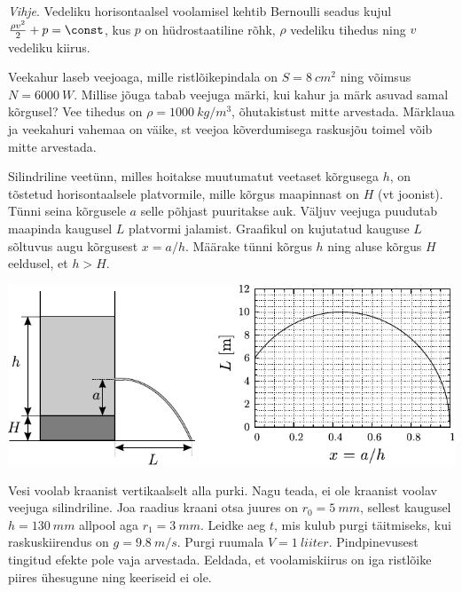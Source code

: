 \documentclass[10pt]{article}
\begin{document}
{\emph{Vihje}. 
Vedeliku horisontaalsel voolamisel kehtib Bernoulli seadus kujul $\frac{\rho v^2}{2}+p=\const$, kus $p$ on hüdrostaatiline rõhk, $\rho$ vedeliku tihedus ning $v$ vedeliku kiirus.
\probend
\bigskip


Veekahur laseb veejoaga, mille ristlõikepindala on $S = \SI{8}{cm^2}$ ning võimsus $N = \SI{6000}{W}$. Millise jõuga tabab veejuga märki, kui kahur ja märk asuvad samal kõrgusel? Vee tihedus on $\rho = \SI{1000}{kg/m^3}$, õhutakistust mitte arvestada. Märklaua ja veekahuri vahemaa on väike, st veejoa kõverdumisega raskusjõu toimel võib mitte arvestada.
\probend
\bigskip


Silindriline veetünn, milles hoitakse muutumatut veetaset kõrgusega $h$, on tõstetud horisontaalsele platvormile, mille kõrgus maapinnast on $H$ (vt joonist). Tünni seina kõrgusele $a$ selle põhjast puuritakse auk. Väljuv veejuga puudutab maapinda kaugusel $L$ platvormi jalamist. Graafikul on kujutatud kauguse $L$ sõltuvus augu kõrgusest $x = a/h$. Määrake tünni kõrgus $h$ ning aluse kõrgus $H$ eeldusel, et $h > H$.

\begin{center}
	\includegraphics[width=\linewidth]{2005-v3g-05-yl}
\end{center}
\probend
\bigskip


Vesi voolab kraanist vertikaalselt alla purki. Nagu teada, ei ole kraanist voolav veejuga silindriline. Joa raadius kraani otsa juures on $r_0 = \SI{5}{mm}$, sellest kaugusel $h = \SI{130}{mm}$ allpool aga $r_1 = \SI{3}{mm}$. Leidke aeg $t$, mis kulub purgi täitmiseks, kui raskuskiirendus on $g = \SI{9,8}{m/s}$. Purgi ruumala $V = \SI{1}{liiter}$. Pindpinevusest tingitud efekte pole vaja arvestada. Eeldada, et voolamiskiirus on iga ristlõike piires ühesugune ning keeriseid ei ole.
\probend
\bigskip

}
\end{document}
